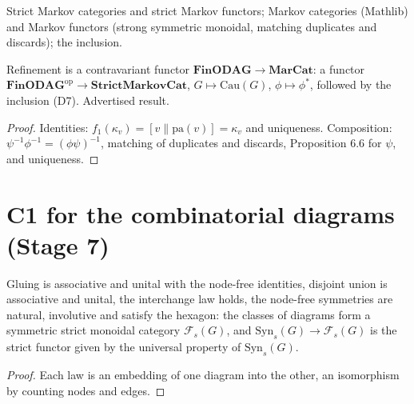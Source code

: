 \begin{definition}
\label{def:6.marcat}
\leanok
{}
Strict Markov categories and strict Markov functors; Markov categories (Mathlib) and Markov
functors (strong symmetric monoidal, matching duplicates and discards); the inclusion.
\end{definition}

\begin{theorem}[Theorem 6.7]
\label{thm:6.7}
\leanok
{}
Refinement is a contravariant functor $\mathbf{FinODAG} \to \mathbf{MarCat}$: a functor
$\mathbf{FinODAG}^{\mathrm{op}} \to \mathbf{StrictMarkovCat}$, $G \mapsto \mathrm{Cau}(G)$,
$\phi \mapsto \phi^*$, followed by the inclusion (D7). Advertised result.
\end{theorem}
\begin{proof}
\leanok
Identities: $f_{1}(\kappa_v) = [v \| \mathrm{pa}(v)] = \kappa_v$ and uniqueness. Composition:
$\psi^{-1}\phi^{-1} = (\phi\psi)^{-1}$, matching of duplicates and discards, Proposition 6.6
for $\psi$, and uniqueness.
\end{proof}

\section{C1 for the combinatorial diagrams (Stage 7)}

\begin{theorem}
\label{s7:laws}
\leanok
{}
Gluing is associative and unital with the node-free identities, disjoint union is
associative and unital, the interchange law holds, the node-free symmetries are natural,
involutive and satisfy the hexagon: the classes of diagrams form a symmetric strict
monoidal category $\mathcal F_s(G)$, and $\mathrm{Syn}_s(G) \to \mathcal F_s(G)$ is the strict
functor given by the universal property of $\mathrm{Syn}_s(G)$.
\end{theorem}
\begin{proof}
\leanok
Each law is an embedding of one diagram into the other, an isomorphism by counting nodes
and edges.
\end{proof}


